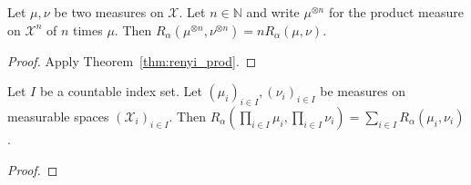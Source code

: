 \begin{corollary}
  \label{lem:renyi_prod_n}
  Let $\mu, \nu$ be two measures on $\mathcal X$. Let $n \in \mathbb{N}$ and write $\mu^{\otimes n}$ for the product measure on $\mathcal X^n$ of $n$ times $\mu$.
  Then $R_\alpha(\mu^{\otimes n}, \nu^{\otimes n}) = n R_\alpha(\mu, \nu)$.
\end{corollary}

\begin{proof}
Apply Theorem~\ref{thm:renyi_prod}.
\end{proof}

\begin{theorem}
  \label{thm:renyi_prod_countable}
  Let $I$ be a countable index set. Let $(\mu_i)_{i \in I}, (\nu_i)_{i \in I}$ be measures on measurable spaces $(\mathcal X_i)_{i \in I}$.
  Then $R_\alpha (\prod_{i \in I} \mu_i, \prod_{i \in I} \nu_i) = \sum_{i \in I} R_\alpha(\mu_i, \nu_i)$.
\end{theorem}

\begin{proof}
\end{proof}
